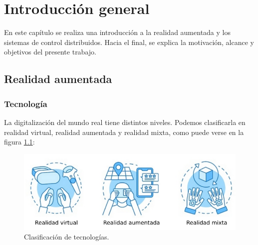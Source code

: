 
\chapter{Introducción general} %

\label{Chapter1} %
\label{IntroGeneral}


\newcommand{\keyword}[1]{\textbf{#1}}
\newcommand{\tabhead}[1]{\textbf{#1}}
\newcommand{\code}[1]{\texttt{#1}}
\newcommand{\file}[1]{\texttt{\bfseries#1}}
\newcommand{\option}[1]{\texttt{\itshape#1}}
\newcommand{\grados}{$^{\circ}$}



En este capítulo se realiza una introducción a la realidad aumentada y los sistemas de control distribuidos. Hacia el final, se explica la motivación, alcance y objetivos del presente trabajo.

\section{Realidad aumentada}
\subsection{Tecnología}

La digitalización del mundo real tiene distintos niveles. Podemos clasificarla en realidad virtual, realidad aumentada y realidad mixta, como puede verse en la figura \ref{fig:realidades}:

\begin{figure}[htpb]
	\centering
	\includegraphics[width=\textwidth]{./Figures/realidades.png}
	\caption{Clasificación de tecnologías\protect\footnotemark.}
	\label{fig:realidades}
\end{figure}

